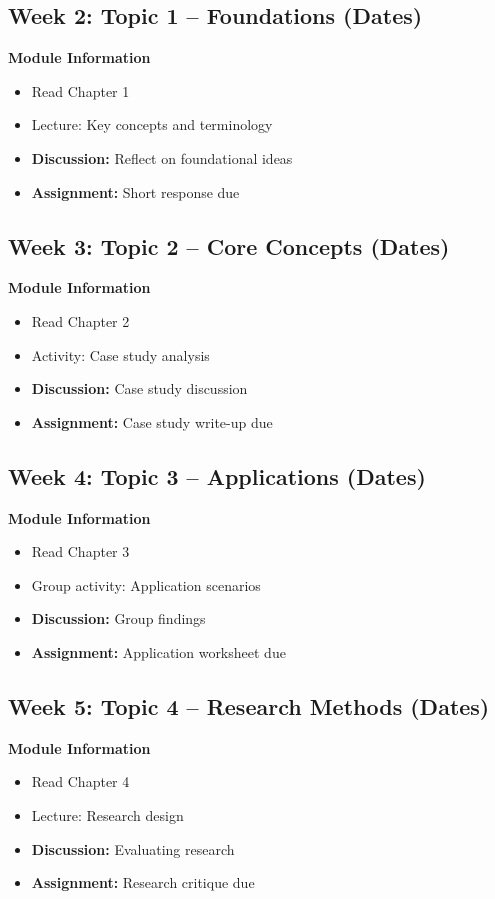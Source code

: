 \documentclass[12pt]{article}
\begin{document}
\subsection*{Week 2: Topic 1 -- Foundations (Dates)}
\textbf{Module Information}
\begin{itemize}
\item Read Chapter 1
\item Lecture: Key concepts and terminology
\item \textbf{Discussion:} Reflect on foundational ideas
\item \textbf{Assignment:} Short response due
\end{itemize}

\subsection*{Week 3: Topic 2 -- Core Concepts (Dates)}
\textbf{Module Information}
\begin{itemize}
\item Read Chapter 2
\item Activity: Case study analysis
\item \textbf{Discussion:} Case study discussion
\item \textbf{Assignment:} Case study write-up due
\end{itemize}

\subsection*{Week 4: Topic 3 -- Applications (Dates)}
\textbf{Module Information}
\begin{itemize}
\item Read Chapter 3
\item Group activity: Application scenarios
\item \textbf{Discussion:} Group findings
\item \textbf{Assignment:} Application worksheet due
\end{itemize}

\subsection*{Week 5: Topic 4 -- Research Methods (Dates)}
\textbf{Module Information}
\begin{itemize}
\item Read Chapter 4
\item Lecture: Research design
\item \textbf{Discussion:} Evaluating research
\item \textbf{Assignment:} Research critique due
\end{itemize}
\end{document}
